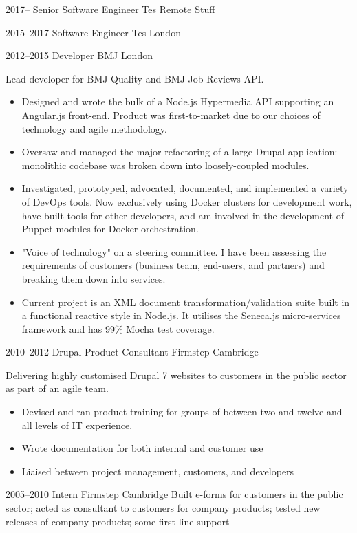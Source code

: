 \documentclass[10pt,a4paper,sans]{moderncv}
\begin{document}
\cventry
  {2017--}
  {Senior Software Engineer}
  {Tes}
  {Remote}
  {}
  {
    Stuff
  }

\cventry
  {2015--2017}
  {Software Engineer}
  {Tes}
  {London}
  {}
  {}

\cventry
  {2012--2015}
  {Developer}
  {BMJ}
  {London}
  {}
  {
    Lead developer for BMJ Quality and BMJ Job Reviews API.
    \begin{itemize}
      \item Designed and wrote the bulk of a Node.js Hypermedia API supporting an Angular.js front-end. Product was first-to-market due to our choices of technology and agile methodology.
      \item Oversaw and managed the major refactoring of a large Drupal application: monolithic codebase was broken down into loosely-coupled modules.
      \item Investigated, prototyped, advocated, documented, and implemented a variety of DevOps tools. Now exclusively using Docker clusters for development work, have built tools for other developers, and am involved in the development of Puppet modules for Docker orchestration.
      \item "Voice of technology" on a steering committee. I have been assessing the requirements of customers (business team, end-users, and partners) and breaking them down into services.
      \item Current project is an XML document transformation/validation suite built in a functional reactive style in Node.js. It utilises the Seneca.js micro-services framework and has 99\% Mocha test coverage.
    \end{itemize}
  }

\cventry
  {2010--2012}
  {Drupal Product Consultant}
  {Firmstep}
  {Cambridge}
  {}
  {
    Delivering highly customised Drupal 7 websites to customers in the public sector as part of an agile team.
    \begin{itemize}
      \item Devised and ran product training for groups of between two and twelve and all levels of IT experience.
      \item Wrote documentation for both internal and customer use
      \item Liaised between project management, customers, and developers
    \end{itemize}
  }

\cventry
  {2005--2010}
  {Intern}
  {Firmstep}
  {Cambridge}
  {}
  {
    Built e-forms for customers in the public sector; acted as consultant to customers for company products; tested new releases of company products; some first-line support
  }
\end{document}
